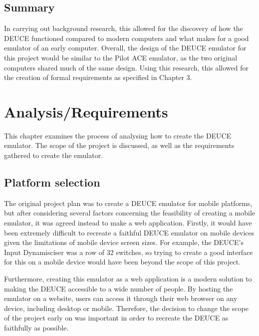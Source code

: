 \documentclass{l4proj}
\begin{document}
\section{Summary}
In carrying out background research, this allowed for the discovery of how the DEUCE functioned compared to modern computers and what makes for a good emulator of an early computer. Overall, the design of the DEUCE emulator for this project would be similar to the Pilot ACE emulator, as the two original computers shared much of the same design. Using this research, this allowed for the creation of formal requirements as specified in Chapter 3.

\chapter{Analysis/Requirements}
This chapter examines the process of analysing how to create the DEUCE emulator. The scope of the project is discussed, as well as the requirements gathered to create the emulator.

\section{Platform selection}
The original project plan was to create a DEUCE emulator for mobile platforms, but after considering several factors concerning the feasibility of creating a mobile emulator, it was agreed instead to make a web application. Firstly, it would have been extremely difficult to recreate a faithful DEUCE emulator on mobile devices given the limitations of mobile device screen sizes. For example, the DEUCE's Input Dynamisciser was a row of 32 switches, so trying to create a good interface for this on a mobile device would have been beyond the scope of this project.

Furthermore, creating this emulator as a web application is a modern solution to making the DEUCE accessible to a wide number of people. By hosting the emulator on a website, users can access it through their web browser on any device, including desktop or mobile. Therefore, the decision to change the scope of the project early on was important in order to recreate the DEUCE as faithfully as possible.
\end{document}
